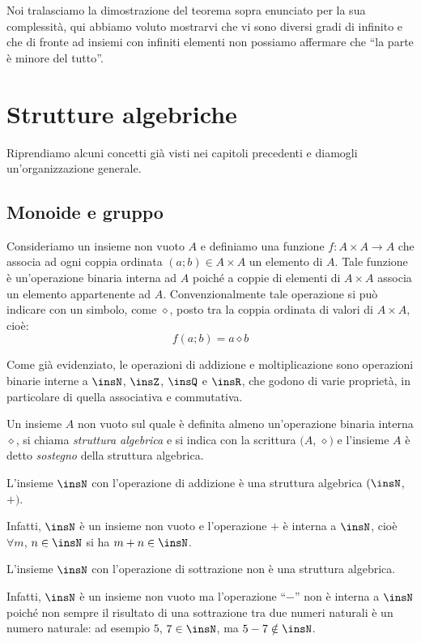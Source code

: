 Noi tralasciamo la dimostrazione del teorema sopra enunciato per la sua complessità,
qui abbiamo voluto mostrarvi che vi sono diversi gradi di infinito e che di fronte ad insiemi con infiniti elementi non possiamo affermare che
``la parte è minore del tutto''.

\ovalbox{\risolvii \ref{ese:E.10}, \ref{ese:E.11}, \ref{ese:E.12}, \ref{ese:E.13}, \ref{ese:E.14}, \ref{ese:E.15}, \ref{ese:E.16}}


\section{Strutture algebriche}

Riprendiamo alcuni concetti già visti nei capitoli precedenti e diamogli un'organizzazione generale.

\subsection{Monoide e gruppo}

Consideriamo un insieme non vuoto $A$ e definiamo una funzione $f:A\times A\rightarrow A$ che associa ad ogni coppia ordinata $(a;b)\in A\times A$ un elemento di $A$. Tale funzione è un'operazione binaria interna ad $A$ poiché a coppie di elementi di $A\times A$ associa un elemento appartenente ad $A$. Convenzionalmente tale operazione si può indicare con un simbolo, come $\diamond$, posto tra la coppia ordinata di valori di $A\times A$, cioè:
\[f(a;b) = a\diamond b\]

Come già evidenziato, le operazioni di addizione e moltiplicazione sono operazioni binarie interne a $\insN$, $\insZ$, $\insQ$ e $\insR$, che godono di varie proprietà, in particolare di quella associativa e commutativa.

\begin{definizione}
Un insieme $A$ non vuoto sul quale è definita almeno un'operazione binaria interna $\diamond$, si chiama \emph{struttura algebrica} e si indica con la scrittura $(A$, $\diamond)$ e l'insieme $A$ è detto \emph{sostegno} della struttura algebrica.
\end{definizione}

\begin{exrig}
 \begin{esempio}
L'insieme $\insN$ con l'operazione di addizione è una struttura algebrica $(\insN$, $+)$.

Infatti, $\insN$ è un insieme non vuoto e l'operazione $+$ è interna a $\insN$, cioè $\forall m$, $n \in \insN$ si ha $m+n \in \insN$.
 \end{esempio}
 
 \begin{esempio}
L'insieme $\insN$ con l'operazione di sottrazione non è una struttura algebrica.

Infatti, $\insN$ è un insieme non vuoto ma l'operazione ``$-$'' non è interna a $\insN$ poiché non sempre il risultato di una sottrazione tra due numeri naturali è un numero naturale: ad esempio $5$, $7\in\insN$, ma $5-7 \notin \insN$.
 \end{esempio}
\end{exrig}

